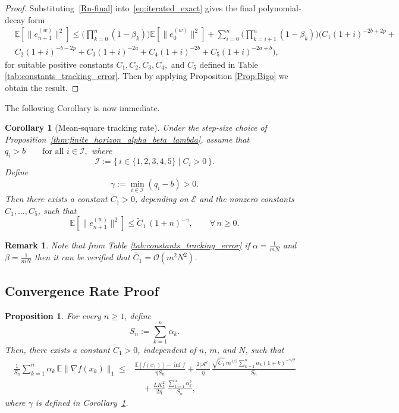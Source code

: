 \documentclass{article}
\newtheorem{corollary}[theorem]{Corollary}
\newtheorem{remark}[theorem]{Remark}
\newtheorem{proposition}[theorem]{Proposition}
\begin{document}
\begin{proof}
Substituting~\eqref{Rn-final} into~\eqref{eq:iterated_exact} gives the final polynomial-decay form
\begin{equation}
\begin{split}
& \mathbb{E}\!\left[\|e_{n+1}^{(w)}\|^2\right]
 \le
\Bigg(\prod_{k=0}^{n}(1-\beta_k)\Bigg)\mathbb{E}\!\left[\|e_0^{(w)}\|^2\right]
 +
\sum_{i=0}^{n}
\Bigg(\prod_{k=i+1}^{n}(1-\beta_k)\Bigg)
\Big(
C_1(1+i)^{-2b+2p}
+ \\ &
C_2(1+i)^{-b-2p}
 +
C_3(1+i)^{-2a}
+
C_4(1+i)^{-2b}
+
C_5(1+i)^{-2a+b}
\Big),
\end{split}
\end{equation}
for suitable positive constants \(C_1,C_2,C_3,C_4,\) and \(C_5\) defined in Table \ref{tab:constants_tracking_error}. Then by applying Proposition \ref{Prop:Bigo} we obtain the result.
\end{proof}
The following Corollary is now immediate.

\begin{corollary}[Mean-square tracking rate]
Under the step-size choice of Proposition~\ref{thm:finite_horizon_alpha_beta_lambda},
assume that
$q_i>b \qquad \text{for all } i\in\mathcal I,$
where
\[
\mathcal I := \{\, i\in\{1,2,3,4,5\} \mid C_i>0 \,\}.
\]
Define
\[
\gamma := \min_{i\in\mathcal I}(q_i-b) > 0.
\]
Then there exists a constant \(\widetilde{C_1}>0\), depending on \(\mathcal E\) and the nonzero constants
\(C_1,\dots,C_5\), such that
\[
\mathbb{E}\!\left[\|e_{n+1}^{(w)}\|^2\right]
\le
\widetilde{C}_1\,(1+n)^{-\gamma},
\qquad \forall\, n\ge0.
\]
\label{mean square tracking raye}
\end{corollary}

\begin{remark}
    Note that from Table \ref{tab:constants_tracking_error} if $\alpha = \frac{1}{mN}$ and $\beta = \frac{1}{m N}$ then it can be verified that $\widetilde{C_1} = \mathcal{O} (m^2 N^2)$.
\end{remark}

\subsection{Convergence Rate Proof}

\begin{proposition}
\label{prop:avg_grad_upper_bound}
For every $n \ge 1$, define
\[
S_n := \sum_{k=1}^n \alpha_k.
\]
Then, there exists a constant $\widetilde C_1 > 0$, independent of $n$, $m$, and $N$, such that
\[
\begin{aligned}
\frac{1}{S_n}\sum_{k=1}^n \alpha_k\,\mathbb{E}\|\nabla f(x_k)\|_1
\le{}&
\frac{\mathbb{E}[f(x_1)]-\inf f}{\eta S_n}
+ \frac{2|\mathcal{A}^c|}{\eta}\,
\frac{\sqrt{\widetilde C_1}\,m^{1/2}\sum\limits_{k=1}^n \alpha_k(1+k)^{-\gamma/2}}{S_n}
\\
&\quad
+ \frac{L K_5^2}{2\eta}\,
\frac{\sum\limits_{k=1}^n \alpha_k^2}{S_n},
\end{aligned}
\]
where $\gamma$ is defined in Corollary~\ref{mean square tracking raye}.
\end{proposition}
\end{document}
